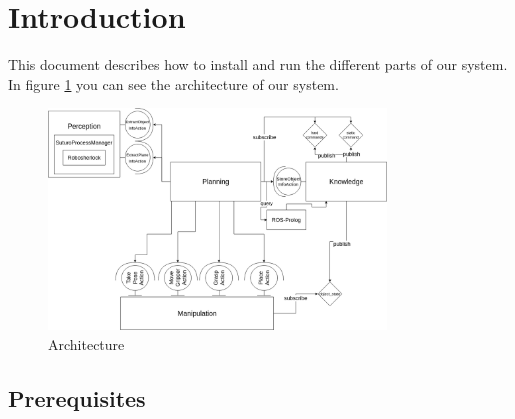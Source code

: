 \documentclass[main.tex]{subfiles}
\begin{document}
\newpage
	\section{Introduction}
	This document describes how to install and run the different parts of our system.\\
	In figure \ref{fig:architecture} you can see the architecture of our system.
	\begin{figure}[h]
\centering
\includegraphics[width=0.8\textwidth]{architecture/architecture}
\caption{Architecture}
\label{fig:architecture}
\end{figure}
	
	\subsection{Prerequisites}
	
\end{document}
